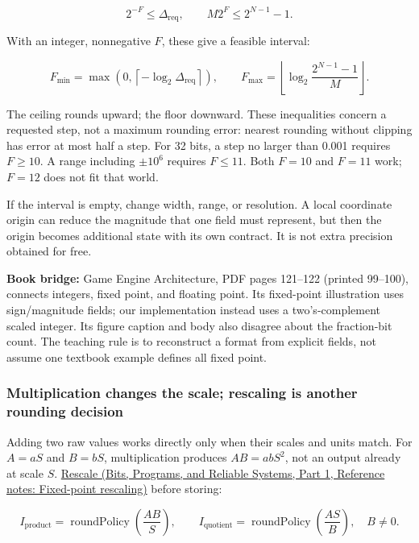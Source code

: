 \[
2^{-F}\le\Delta_{\mathrm{req}},
\qquad
M2^F\le2^{N-1}-1.
\]

With an integer, nonnegative \(F\), these give a feasible interval:

\[
F_{\min}=\max\!\left(0,\left\lceil-\log_2\Delta_{\mathrm{req}}\right\rceil\right),
\qquad
F_{\max}=\left\lfloor\log_2\frac{2^{N-1}-1}{M}\right\rfloor.
\]

The ceiling rounds upward; the floor downward. These inequalities concern a requested step, not a maximum rounding error: nearest rounding without clipping has error at most half a step. For 32 bits, a step no larger than 0.001 requires \(F\ge10\). A range including \(\pm10^6\) requires \(F\le11\). Both \(F=10\) and \(F=11\) work; \(F=12\) does not fit that world.

If the interval is empty, change width, range, or resolution. A local coordinate origin can reduce the magnitude that one field must represent, but then the origin becomes additional state with its own contract. It is not extra precision obtained for free.

\textbf{Book bridge:} Game Engine Architecture, PDF pages 121--122 (printed 99--100), connects integers, fixed point, and floating point. Its fixed-point illustration uses sign/magnitude fields; our implementation instead uses a two's-complement scaled integer. Its figure caption and body also disagree about the fraction-bit count. The teaching rule is to reconstruct a format from explicit fields, not assume one textbook example defines all fixed point.

\subsubsection{Multiplication changes the scale; rescaling is another rounding decision}\label{05-engine-i-ch001-multiplication-changes-the-scale-rescaling-is-another-rounding-decision}

\hypertarget{05-engine-i-ch001-multiplication-changes-the-scale-rescaling-is-another-rounding-decision}{}

Adding two raw values works directly only when their scales and units match. For \(A=aS\) and \(B=bS\), multiplication produces \(AB=abS^2\), not an output already at scale \(S\). \href{../01-Bits-Programs-and-Reliable-Systems-P01/main.pdf\#appendix-3333db47830f}{Rescale (Bits, Programs, and Reliable Systems, Part 1, Reference notes: Fixed-point rescaling)} before storing:

\[
I_{\mathrm{product}}=\operatorname{roundPolicy}\!\left(\frac{AB}{S}\right),
\qquad
I_{\mathrm{quotient}}=\operatorname{roundPolicy}\!\left(\frac{AS}{B}\right),\quad B\ne0.
\]

